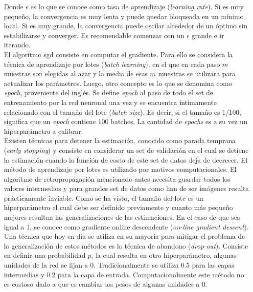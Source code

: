 \indent Donde $\epsilon$ es lo que se conoce como tasa de aprendizaje (\textit{learning rate}). Si es muy pequeño, la convergencia es muy lenta y puede quedar bloqueada en un mínimo local. Si es muy grande, la convergencia puede oscilar alrededor de un óptimo sin estabilizarse y converger. Es recomendable comenzar con un $\epsilon$ grande e ir iterando. \\
\indent El algoritmo \acrshort{sgd} consiste en computar el gradiente. Para ello se considera la técnica de aprendizaje por lotes (\textit{batch learning}), en el que en cada paso $m$ muestras son elegidas al azar y la media de esas $m$ muestras se utilizara para actualizar los parámetros. Luego, otro concepto es lo que se denomina como \textit{epoch}, proveniente del inglés. Se define \textit{epoch} al paso de todo el set de entrenamiento por la red neuronal una vez y se encuentra íntimamente relacionado con el tamaño del lote (\textit{batch size}). Es decir, si el tamaño es 1/100, significa que un \textit{epoch} contiene 100 batches. La cantidad de \textit{epochs} es a su vez un hiperparámetro a calibrar. \\ 
\indent Existen técnicas para detener la estimación, conocido como parada temprana (\textit{early stopping}) y consiste en considerar un set de validación en el cual se detiene la estimación cuando la función de costo de este set de datos deja de decrecer. El método de aprendizaje por lotes es utilizado por motivos computacionales. El algoritmo de retropropagación mencionado antes necesita guardar todos los valores intermedios y para grandes set de datos como han de ser imágenes resulta prácticamente inviable. Como se ha visto, el tamaño del lote es un hiperparámetro el cual debe ser definido previamente y cuanto más pequeño mejores resultan las generalizaciones de las estimaciones. En el caso de que sea igual a 1, se conoce como gradiente online descendente (\textit{on-line gradient descent}). \\
\indent Una técnica que hoy en día se utiliza en su mayoría para mitigar el problema de la generalización de estos métodos es la técnica de abandono (\textit{drop-out}). Consiste en definir una probabilidad $p$, la cual resulta en otro hiperparámetro, algunas unidades de la red se fijan a 0. Tradicionalmente se utiliza 0.5 para las capas intermedias y 0.2 para la capa de entrada. Computacionalmente este método no es costoso dado a que es cambiar los pesos de algunas unidades a 0.


